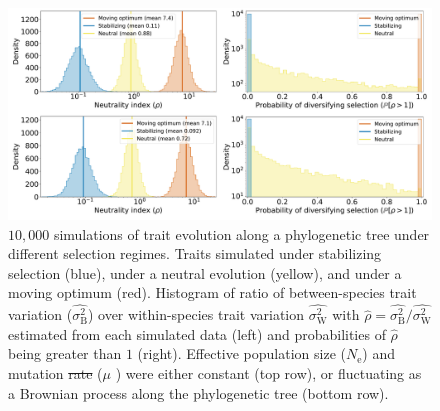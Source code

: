 \documentclass{article}
\newcommand{\Ne}{N_{\text{e}}}
\newcommand{\MutationRatePheno}{\mu}
\newcommand{\MutationRateNuc}{u} %
\newcommand{\RateBetween}{\sigma^2_{\mathrm{B}}}
\newcommand{\RateWhithin}{\sigma^2_{\mathrm{W}}}
\newcommand{\EstRateBetween}{\widehat{\RateBetween}}
\newcommand{\EstRateWhithin}{\widehat{\RateWhithin}}
\newcommand{\EstNI}{\widehat{\rho}}
\providecommand{\DIFaddtex}[1]{{\protect\color{blue}\uwave{#1}}} %
\providecommand{\DIFdeltex}[1]{{\protect\color{red}\sout{#1}}}                      %
\providecommand{\DIFaddFL}[1]{\DIFadd{#1}} %
\providecommand{\DIFdelFL}[1]{\DIFdel{#1}} %
\providecommand{\DIFaddbeginFL}{} %
\providecommand{\DIFaddendFL}{} %
\providecommand{\DIFdelbeginFL}{} %
\providecommand{\DIFdelendFL}{} %
\providecommand{\DIFadd}[1]{\texorpdfstring{\DIFaddtex{#1}}{#1}} %
\providecommand{\DIFdel}[1]{\texorpdfstring{\DIFdeltex{#1}}{}} %
\newcommand{\DIFscaledelfig}{0.5}
\newlength{\DIFdelgraphicswidth} %
\newlength{\DIFdelgraphicsheight} %
\newcommand{\DIFaddincludegraphics}[2][]{{\color{blue}\fbox{\DIFOincludegraphics[#1]{#2}}}} %
\newcommand{\DIFdelincludegraphics}[2][]{%
\sbox{\DIFdelgraphicsbox}{\DIFOincludegraphics[#1]{#2}}%
\settoboxwidth{\DIFdelgraphicswidth}{\DIFdelgraphicsbox} %
\settoboxtotalheight{\DIFdelgraphicsheight}{\DIFdelgraphicsbox} %
\scalebox{\DIFscaledelfig}{%
\parbox[b]{\DIFdelgraphicswidth}{\usebox{\DIFdelgraphicsbox}\\[-\baselineskip] \rule{\DIFdelgraphicswidth}{0em}}\llap{\resizebox{\DIFdelgraphicswidth}{\DIFdelgraphicsheight}{%
\setlength{\unitlength}{\DIFdelgraphicswidth}%
\begin{picture}(1,1)%
\thicklines\linethickness{2pt} %
{\color[rgb]{1,0,0}\put(0,0){\framebox(1,1){}}}%
{\color[rgb]{1,0,0}\put(0,0){\line( 1,1){1}}}%
{\color[rgb]{1,0,0}\put(0,1){\line(1,-1){1}}}%
\end{picture}%
}\hspace*{3pt}}} %
} %
\DeclareRobustCommand{\DIFaddbeginFL}{\DIFOaddbeginFL \let\includegraphics\DIFaddincludegraphics} %
\DeclareRobustCommand{\DIFaddendFL}{\DIFOaddendFL \let\includegraphics\DIFOincludegraphics} %
\DeclareRobustCommand{\DIFdelbeginFL}{\DIFOdelbeginFL \let\includegraphics\DIFdelincludegraphics} %
\DeclareRobustCommand{\DIFdelendFL}{\DIFOaddendFL \let\includegraphics\DIFOincludegraphics} %
\begin{document}
\begin{figure}[!ht]
    \centering
    \includegraphics[width=\textwidth, page=1] {figure3}
    \caption{
        $10,000$ simulations of trait evolution along a phylogenetic tree under different selection regimes.
        Traits simulated under stabilizing selection (blue), under a neutral evolution (yellow), and under a moving optimum (red).
        Histogram of ratio of between-species trait variation ($\EstRateBetween$) over within-species trait variation $\EstRateWhithin$ with $\EstNI = \EstRateBetween / \EstRateWhithin$ estimated from each simulated data (left) and probabilities of $\EstNI$ being greater than $1$ (right).
        Effective population size ($\Ne$) and mutation \DIFdelbeginFL \DIFdelFL{rate }\DIFdelendFL \DIFaddbeginFL \DIFaddFL{rates }\DIFaddendFL ($\MutationRatePheno$ \DIFaddbeginFL \DIFaddFL{and $\MutationRateNuc$}\DIFaddendFL ) were either constant (top row), or fluctuating as a Brownian process along the phylogenetic tree (bottom row).
    }
    \label{fig:results-simulations}
\end{figure}
\end{document}

